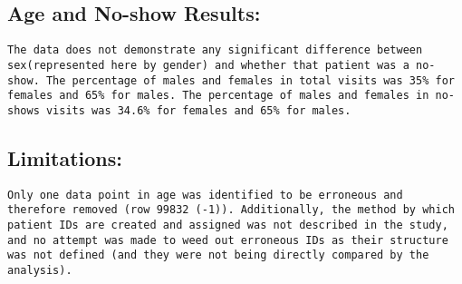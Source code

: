 \documentclass[11pt]{article}
\begin{document}
    \subsection{Age and No-show Results:}\label{age-and-no-show-results}

\begin{verbatim}
The data does not demonstrate any significant difference between sex(represented here by gender) and whether that patient was a no-show. The percentage of males and females in total visits was 35% for females and 65% for males. The percentage of males and females in no-shows visits was 34.6% for females and 65% for males. 
\end{verbatim}

    \subsection{Limitations:}\label{limitations}

\begin{verbatim}
Only one data point in age was identified to be erroneous and therefore removed (row 99832 (-1)). Additionally, the method by which patient IDs are created and assigned was not described in the study, and no attempt was made to weed out erroneous IDs as their structure was not defined (and they were not being directly compared by the analysis). 
\end{verbatim}


    
    
    
    
\end{document}
